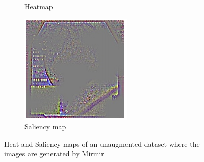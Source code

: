 \begin{figure}[t]
\begin{subfigure}[t]{0.3\textwidth}
         \caption{Heatmap}
         \label{fig:sal2}
     \end{subfigure}     
     \hfill
     \begin{subfigure}[t]{0.3\textwidth}
         \centering
         \includegraphics[width=\textwidth]{methodology/figures/sal3.png}
         \caption{Saliency map}
         \label{fig:sal3}
     \end{subfigure}
     \caption{Heat and Saliency maps of an unaugmented dataset where the images are generated by Mirmir}
     \label{fig:Saliencymasks}
\end{figure}


